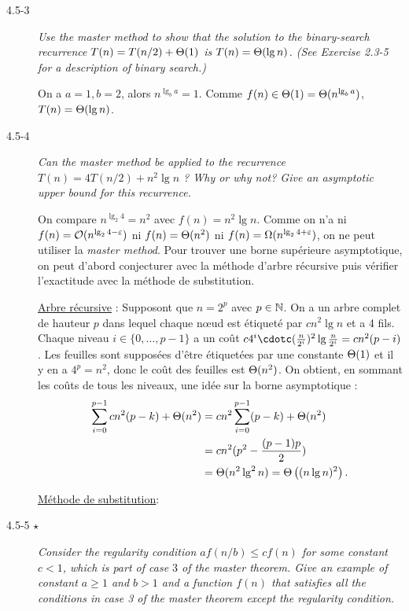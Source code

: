 \begin{description}
  \item[4.5-3] {\itshape Use the master method to show that the solution to the binary-search recurrence $T(n) = T(n/2) + \Theta(1)$ is $T(n) = \Theta(\lg n)$. (See Exercise 2.3-5 for a description of binary search.)}

    \begin{ex}
       On a $a=1, b=2$, alors $n^{\lg_b a} = 1$. Comme $f(n) \in \Theta(1) = \Theta(n^{\lg_b a})$, $T(n) = \Theta(\lg n)$.
    \end{ex}
  
  \item[4.5-4] {\itshape Can the master method be applied to the recurrence $T(n) = 4T(n/2) + n^2\lg n$ ? Why or why not? Give an asymptotic upper bound for this recurrence.}
    \begin{exrev} %
      On compare $n^{\lg_2 4} = n^2$ avec $f(n) = n^2\lg n$. Comme on n'a ni $f(n) = \mathcal{O}(n^{\lg_2 4 - \varepsilon})$ ni $f(n) = \Theta(n^2)$  ni $f(n) = \Omega(n^{\lg_2 4 + \varepsilon})$, on ne peut utiliser la {\itshape master method}. Pour trouver une borne sup\'erieure asymptotique, on peut d'abord conjecturer avec la m\'ethode d'arbre r\'ecursive puis v\'erifier l'exactitude avec la m\'ethode de substitution.

      \ul{Arbre r\'ecursive} : Supposont que $n = 2^p$ avec $p \in \mathbb{N}$. On a un arbre complet de hauteur $p$ dans lequel chaque n\oe ud est \'etiquet\'e par $cn^2\lg n$ et a 4 fils. Chaque niveau $i \in \{0, \ldots, p - 1\}$ a un co\^ut $c4^i\cdotc(\frac{n}{2^i})^2\lg \frac{n}{2^i} = cn^2(p - i)$. Les feuilles sont suppos\'ees d'\^etre \'etiquet\'ees par une constante $\Theta(1)$ et il y en a $4^p = n^2$, donc le co\^ut des feuilles est $\Theta(n^2)$. On obtient, en sommant les co\^uts de tous les niveaux, une id\'ee sur la borne asymptotique :
      \begin{align*}
        \sum_{i=0}^{p-1}cn^2(p-k)+ \Theta(n^2) &= cn^2\sum_{i=0}^{p-1}(p-k) + \Theta(n^2)\\
        &= cn^2(p^2 - \frac{(p-1)p}{2})\\
        &= \Theta(n^2\lg^2 n) = \Theta\left( (n\lg n)^2 \right).
      \end{align*}

    \ul{M\'ethode de substitution}:
    \end{exrev}
  
  \item[4.5-5 $\star$] {\itshape Consider the regularity condition $af(n/b) \le cf(n)$ for some constant $c < 1$, which is part of case $3$ of the master theorem. Give an example of constant $a\ge 1$ and $b>1$ and a function $f(n)$ that satisfies all the conditions in case 3 of the master theorem except the regularity condition.}
    \begin{exrev}
      
    \end{exrev}
\end{description}


